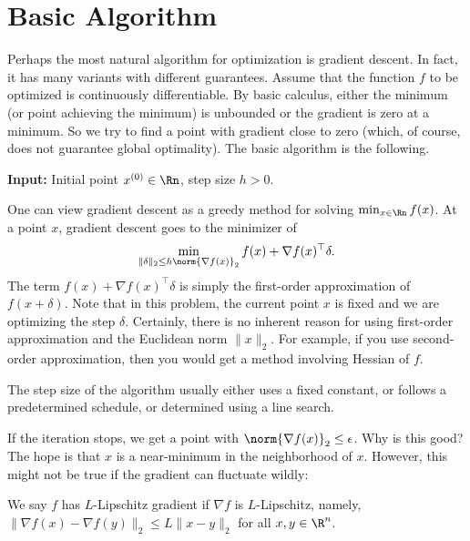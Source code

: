 \section{Basic Algorithm\label{sec:Gradient-Descent}}

Perhaps the most natural algorithm for optimization is gradient descent.
In fact, it has many variants with different guarantees. Assume that
the function $f$ to be optimized is continuously differentiable.
By basic calculus, either the minimum (or point achieving the minimum)
is unbounded or the gradient is zero at a minimum. So we try to find
a point with gradient close to zero (which, of course, does not guarantee
global optimality). The basic algorithm is the following. 

\begin{algorithm2e}[H]

\caption{$\mathtt{GradientDescent}$ (GD)}

\SetAlgoLined

\textbf{Input:} Initial point $x^{(0)}\in\Rn$, step size $h>0$.


\end{algorithm2e}

One can view gradient descent as a greedy method for solving $\min_{x\in\Rn}f(x)$.
At a point $x$, gradient descent goes to the minimizer of 
\[
\min_{\|\delta\|_{2}\leq h\norm{\nabla f(x)}_{2}}f(x)+\nabla f(x)^{\top}\delta.
\]
The term $f(x)+\nabla f(x)^{\top}\delta$ is simply the first-order
approximation of $f(x+\delta)$. Note that in this problem, the current
point $x$ is fixed and we are optimizing the step $\delta$. Certainly,
there is no inherent reason for using first-order approximation and
the Euclidean norm $\|x\|_{2}$. For example, if you use second-order
approximation, then you would get a method involving Hessian of $f$.

The step size of the algorithm usually either uses a fixed constant,
or follows a predetermined schedule, or determined using a line search.

If the iteration stops, we get a point with $\norm{\nabla f(x)}_{2}\le\epsilon$.
Why is this good? The hope is that $x$ is a near-minimum in the neighborhood
of $x$. However, this might not be true if the gradient can fluctuate
wildly:
\begin{defn}
We say $f$ has $L$-Lipschitz gradient if $\nabla f$ is $L$-Lipschitz,
namely, $\|\nabla f(x)-\nabla f(y)\|_{2}\leq L\|x-y\|_{2}$ for all
$x,y\in\R^{n}$.
\end{defn}

